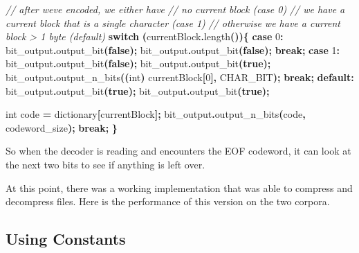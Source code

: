 \documentclass[12pt,twoside]{reedthesis}
\newenvironment{Shaded}{\begin{snugshade}}{\end{snugshade}}
\newcommand{\CommentTok}[1]{\textcolor[rgb]{0.56,0.35,0.01}{\textit{#1}}}
\newcommand{\ControlFlowTok}[1]{\textcolor[rgb]{0.13,0.29,0.53}{\textbf{#1}}}
\newcommand{\DataTypeTok}[1]{\textcolor[rgb]{0.13,0.29,0.53}{#1}}
\newcommand{\DecValTok}[1]{\textcolor[rgb]{0.00,0.00,0.81}{#1}}
\newcommand{\KeywordTok}[1]{\textcolor[rgb]{0.13,0.29,0.53}{\textbf{#1}}}
\newcommand{\NormalTok}[1]{#1}
\newcommand{\OperatorTok}[1]{\textcolor[rgb]{0.81,0.36,0.00}{\textbf{#1}}}
\begin{document}
\begin{Shaded}
\begin{Highlighting}[]
\CommentTok{// after we\textquotesingle{}ve encoded, we either have }
\CommentTok{// no current block (case 0)}
\CommentTok{// we have a current block that is a single character (case 1)}
\CommentTok{// otherwise we have a current block \textgreater{} 1 byte (default)}
\ControlFlowTok{switch} \OperatorTok{(}\NormalTok{currentBlock}\OperatorTok{.}\NormalTok{length}\OperatorTok{())\{}
\ControlFlowTok{case} \DecValTok{0}\OperatorTok{:}
\NormalTok{    bit\_output}\OperatorTok{.}\NormalTok{output\_bit}\OperatorTok{(}\KeywordTok{false}\OperatorTok{);}
\NormalTok{    bit\_output}\OperatorTok{.}\NormalTok{output\_bit}\OperatorTok{(}\KeywordTok{false}\OperatorTok{);}
    \ControlFlowTok{break}\OperatorTok{;}
\ControlFlowTok{case} \DecValTok{1}\OperatorTok{:}
\NormalTok{    bit\_output}\OperatorTok{.}\NormalTok{output\_bit}\OperatorTok{(}\KeywordTok{false}\OperatorTok{);}
\NormalTok{    bit\_output}\OperatorTok{.}\NormalTok{output\_bit}\OperatorTok{(}\KeywordTok{true}\OperatorTok{);}
\NormalTok{    bit\_output}\OperatorTok{.}\NormalTok{output\_n\_bits}\OperatorTok{((}\DataTypeTok{int}\OperatorTok{)}\NormalTok{ currentBlock}\OperatorTok{[}\DecValTok{0}\OperatorTok{],}\NormalTok{ CHAR\_BIT}\OperatorTok{);}
    \ControlFlowTok{break}\OperatorTok{;}
\ControlFlowTok{default}\OperatorTok{:}
\NormalTok{    bit\_output}\OperatorTok{.}\NormalTok{output\_bit}\OperatorTok{(}\KeywordTok{true}\OperatorTok{);}
\NormalTok{    bit\_output}\OperatorTok{.}\NormalTok{output\_bit}\OperatorTok{(}\KeywordTok{true}\OperatorTok{);}

    \DataTypeTok{int}\NormalTok{ code }\OperatorTok{=}\NormalTok{ dictionary}\OperatorTok{[}\NormalTok{currentBlock}\OperatorTok{];}
\NormalTok{    bit\_output}\OperatorTok{.}\NormalTok{output\_n\_bits}\OperatorTok{(}\NormalTok{code}\OperatorTok{,}\NormalTok{ codeword\_size}\OperatorTok{);}
    \ControlFlowTok{break}\OperatorTok{;}
\OperatorTok{\}}
\end{Highlighting}
\end{Shaded}
So when the decoder is reading and encounters the EOF codeword, it can look at the next two bits to see if anything is left over.

At this point, there was a working implementation that was able to compress and decompress files. Here is the performance of this version on the two corpora.

\hypertarget{using-constants}{%
\subsection{Using Constants}\label{using-constants}}
\end{document}
